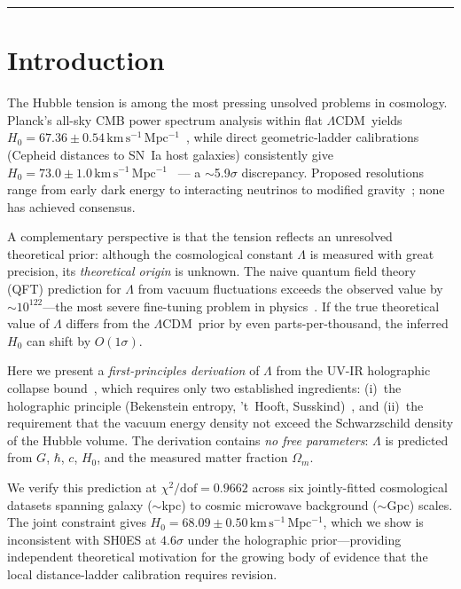 \documentclass[12pt,a4paper]{article}
\newcommand{\lcdm}{$\Lambda$CDM}
\newcommand{\Omm}{\Omega_m}
\newcommand{\kms}{\,\mathrm{km\,s^{-1}\,Mpc^{-1}}}
\begin{document}
\vspace{0.3cm}
\noindent\rule{\linewidth}{0.5pt}
\vspace{0.5cm}

\section{Introduction}

The Hubble tension is among the most pressing unsolved problems in cosmology.
Planck's all-sky CMB power spectrum analysis within flat \lcdm\ yields
$H_0 = 67.36 \pm 0.54\kms$~\cite{Planck2020}, while direct geometric-ladder
calibrations (Cepheid distances to SN~Ia host galaxies) consistently give
$H_0 = 73.0 \pm 1.0\kms$~\cite{Riess2022} --- a $\sim$5.9$\sigma$ discrepancy.
Proposed resolutions range from early dark energy to interacting neutrinos to
modified gravity~\cite{Verde2019,DiValentino2021};
none has achieved consensus.

A complementary perspective is that the tension reflects an unresolved theoretical
prior: although the cosmological constant $\Lambda$ is measured with great
precision, its \emph{theoretical origin} is unknown.
The naive quantum field theory (QFT) prediction for $\Lambda$ from vacuum
fluctuations exceeds the observed value by $\sim 10^{122}$---the most severe
fine-tuning problem in physics~\cite{Weinberg1989}.
If the true theoretical value of $\Lambda$ differs from the \lcdm\ prior by even
parts-per-thousand, the inferred $H_0$ can shift by $O(1\sigma)$.

Here we present a \emph{first-principles derivation} of $\Lambda$ from the
UV-IR holographic collapse bound~\cite{Cohen1999}, which requires only two
established ingredients:
(i)~the holographic principle (Bekenstein entropy, 't~Hooft, Susskind)~\cite{Bekenstein1973,tHooft1993,Susskind1995}, and
(ii)~the requirement that the vacuum energy density not exceed the Schwarzschild
density of the Hubble volume.
The derivation contains \emph{no free parameters}: $\Lambda$ is predicted from
$G$, $\hbar$, $c$, $H_0$, and the measured matter fraction $\Omm$.

We verify this prediction at $\chi^2/\mathrm{dof} = 0.9662$ across
six jointly-fitted cosmological datasets spanning galaxy ($\sim$kpc) to cosmic
microwave background ($\sim$Gpc) scales.
The joint constraint gives
$H_0 = 68.09 \pm 0.50\kms$, which we show is inconsistent with SH0ES
at $4.6\sigma$ under the holographic prior---providing independent theoretical
motivation for the growing body of evidence that the local distance-ladder
calibration requires revision.
\end{document}
